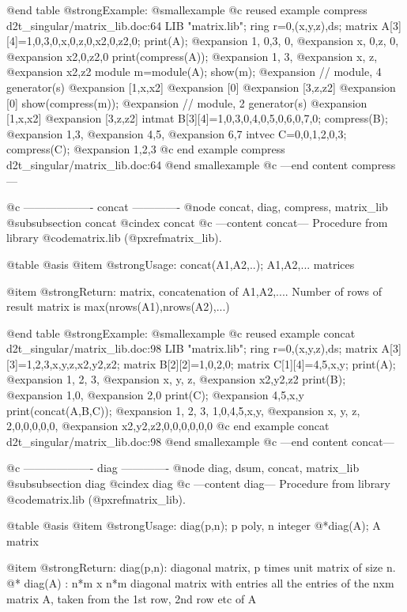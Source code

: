 @end table
@strong{Example:}
@smallexample
@c reused example compress d2t_singular/matrix_lib.doc:64 
LIB "matrix.lib";
ring r=0,(x,y,z),ds;
matrix A[3][4]=1,0,3,0,x,0,z,0,x2,0,z2,0;
print(A);
@expansion{} 1, 0,3, 0,
@expansion{} x, 0,z, 0,
@expansion{} x2,0,z2,0 
print(compress(A));
@expansion{} 1, 3,
@expansion{} x, z,
@expansion{} x2,z2
module m=module(A); show(m);
@expansion{} // module, 4 generator(s)
@expansion{} [1,x,x2]
@expansion{} [0]
@expansion{} [3,z,z2]
@expansion{} [0]
show(compress(m));
@expansion{} // module, 2 generator(s)
@expansion{} [1,x,x2]
@expansion{} [3,z,z2]
intmat B[3][4]=1,0,3,0,4,0,5,0,6,0,7,0;
compress(B);
@expansion{} 1,3,
@expansion{} 4,5,
@expansion{} 6,7 
intvec C=0,0,1,2,0,3;
compress(C);
@expansion{} 1,2,3
@c end example compress d2t_singular/matrix_lib.doc:64
@end smallexample
@c ---end content compress---

@c ------------------- concat -------------
@node concat, diag, compress, matrix_lib
@subsubsection concat
@cindex concat
@c ---content concat---
Procedure from library @code{matrix.lib} (@pxref{matrix_lib}).

@table @asis
@item @strong{Usage:}
concat(A1,A2,..); A1,A2,... matrices

@item @strong{Return:}
matrix, concatenation of A1,A2,.... Number of rows of result matrix
is max(nrows(A1),nrows(A2),...)

@end table
@strong{Example:}
@smallexample
@c reused example concat d2t_singular/matrix_lib.doc:98 
LIB "matrix.lib";
ring r=0,(x,y,z),ds;
matrix A[3][3]=1,2,3,x,y,z,x2,y2,z2;
matrix B[2][2]=1,0,2,0; matrix C[1][4]=4,5,x,y;
print(A);
@expansion{} 1, 2, 3,
@expansion{} x, y, z,
@expansion{} x2,y2,z2
print(B);
@expansion{} 1,0,
@expansion{} 2,0 
print(C);
@expansion{} 4,5,x,y
print(concat(A,B,C));
@expansion{} 1, 2, 3, 1,0,4,5,x,y,
@expansion{} x, y, z, 2,0,0,0,0,0,
@expansion{} x2,y2,z2,0,0,0,0,0,0 
@c end example concat d2t_singular/matrix_lib.doc:98
@end smallexample
@c ---end content concat---

@c ------------------- diag -------------
@node diag, dsum, concat, matrix_lib
@subsubsection diag
@cindex diag
@c ---content diag---
Procedure from library @code{matrix.lib} (@pxref{matrix_lib}).

@table @asis
@item @strong{Usage:}
diag(p,n); p poly, n integer
@*diag(A); A matrix

@item @strong{Return:}
diag(p,n): diagonal matrix, p times unit matrix of size n.
@* diag(A) : n*m x n*m diagonal matrix with entries all the entries of
the nxm matrix A, taken from the 1st row, 2nd row etc of A

